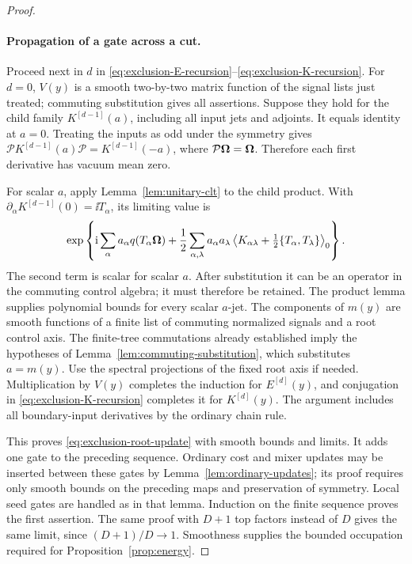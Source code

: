 \begin{proof}
\paragraph{Propagation of a gate across a cut.}
Proceed next in $d$ in
\eqref{eq:exclusion-E-recursion}--\eqref{eq:exclusion-K-recursion}.
For $d=0$, $V(y)$ is a smooth two-by-two matrix function of
the signal lists just treated; commuting substitution gives
all assertions.  Suppose they hold for the child family
$K^{[d-1]}(a)$, including all input jets and adjoints.  It
equals identity at $a=0$.  Treating the inputs as odd under
the symmetry gives
$\mathscr P K^{[d-1]}(a)\mathscr P=K^{[d-1]}(-a)$,
where $\mathcal{P}\boldsymbol\Omega=\boldsymbol\Omega$.  Therefore each first derivative
has vacuum mean zero.

For scalar $a$, apply Lemma~\ref{lem:unitary-clt} to the
child product.  With
$\partial_\alpha K^{[d-1]}(0)=\ii T_\alpha$, its limiting
value is
\begin{equation}\label{eq:exclusion-product-limit}
 \exp\left\{\mathrm i\sum_\alpha a_\alpha q(T_\alpha\boldsymbol\Omega)
 +\frac12\sum_{\alpha,\lambda}a_\alpha a_\lambda
    \left\langle K_{\alpha\lambda}
       +\tfrac12\{T_\alpha,T_\lambda\}\right\rangle_0
 \right\}.
\end{equation}
The second term is scalar for scalar $a$.  After substitution
it can be an operator in the commuting control algebra; it
must therefore be retained.  The product lemma supplies
polynomial bounds for every scalar $a$-jet.  The components
of $m(y)$ are smooth functions of a finite list of commuting
normalized signals and a root control axis.  The finite-tree
commutations already established imply the hypotheses of
Lemma~\ref{lem:commuting-substitution}, which substitutes
$a=m(y)$.  Use the spectral projections of the fixed root
axis if needed.  Multiplication by $V(y)$ completes the
induction for $E^{[d]}(y)$, and conjugation in
\eqref{eq:exclusion-K-recursion} completes it for $K^{[d]}(y)$.
The argument includes all boundary-input derivatives by
the ordinary chain rule.

This proves \eqref{eq:exclusion-root-update} with smooth
bounds and limits.  It adds one gate to the preceding
sequence.  Ordinary cost and mixer updates may be inserted
between these gates by Lemma~\ref{lem:ordinary-updates};
its proof requires only smooth bounds on the preceding maps
and preservation of symmetry.  Local seed gates are handled
as in that lemma.  Induction on the finite sequence proves
the first assertion.  The same proof with $D+1$ top factors
instead of $D$ gives the same limit, since $(D+1)/D\to1$.
Smoothness supplies the bounded occupation required for
Proposition~\ref{prop:energy}.


\end{proof}
